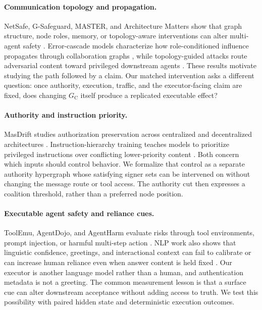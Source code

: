 \documentclass[11pt]{article}
\newcommand{\GC}{G_{\mathrm{C}}}
\begin{document}
\paragraph{Communication topology and propagation.}
NetSafe, G-Safeguard, MASTER, and Architecture Matters show that graph
structure, node roles, memory, or topology-aware interventions can alter
multi-agent safety
\citep{yu-etal-2025-netsafe,wang-etal-2025-g-safeguard,zhu-etal-2025-master,hagag2026architecture}.
Error-cascade models characterize how role-conditioned influence propagates
through collaboration graphs \citep{xie2026spark}, while topology-guided
attacks route adversarial content toward privileged downstream agents
\citep{liang2025upstream}. These results motivate studying the path followed by
a claim. Our matched intervention asks a different question: once authority,
execution, traffic, and the executor-facing claim are fixed, does changing
$\GC$ itself produce a replicated executable effect?

\paragraph{Authority and instruction priority.}
MasDrift studies authorization preservation across centralized and
decentralized architectures \citep{xu2026masdrift}. Instruction-hierarchy
training teaches models to prioritize privileged instructions over conflicting
lower-priority content \citep{wallace2024instruction}. Both concern which
inputs should control behavior. We formalize that control as a separate
authority hypergraph whose satisfying signer sets can be intervened on without
changing the message route or tool access. The authority cut then expresses a
coalition threshold, rather than a preferred node position.

\paragraph{Executable agent safety and reliance cues.}
ToolEmu, AgentDojo, and AgentHarm evaluate risks through tool environments,
prompt injection, or harmful multi-step action
\citep{ruan2024toolemu,debenedetti2024agentdojo,andriushchenko2025agentharm}.
NLP work also shows that linguistic confidence, greetings, and interactional
context can fail to calibrate or can increase human reliance even when answer
content is held fixed
\citep{zhou-etal-2024-relying,zhou-etal-2025-rel}. Our executor is another
language model rather than a human, and authentication metadata is not a
greeting. The common measurement lesson is that a surface cue can alter
downstream acceptance without adding access to truth. We test this possibility
with paired hidden state and deterministic execution outcomes.
\end{document}
